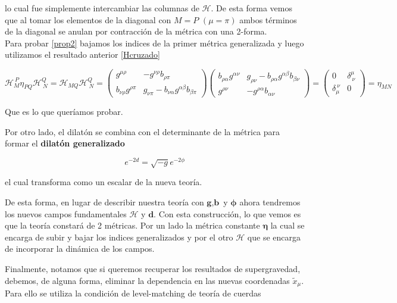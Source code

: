 \documentclass{article}
\numberwithin{equation}{section}
\begin{document}
lo cual fue simplemente intercambiar las columnas de $ \pmb{\mathcal{H}} $. De esta forma vemos que al tomar los elementos de la diagonal con $ M=P $ $ (\mu=\pi) $ ambos términos de la diagonal se anulan por contracción de la métrica con una 2-forma.\\

Para probar \ref{prop2} bajamos los indices de la primer métrica generalizada y luego utilizamos el resultado anterior \ref{Hcruzado}

\begin{equation}\label{key}
\mathcal{H}_M^{\ P}\eta_{PQ}\mathcal{H}^Q_{\ N} = \mathcal{H}_{MQ}\mathcal{H}^Q_{\ N} = 
\begin{pmatrix}
g^{\mu\rho} & -g^{\nu\rho}b_{\rho\pi}\\
b_{\nu\rho}g^{\rho\pi} & g_{\nu\pi} -b_{\nu\alpha}g^{\alpha\beta}b_{\beta\pi}
\end{pmatrix}
\begin{pmatrix}
b_{\rho\alpha}g^{\alpha\nu} & g_{\rho\nu} -b_{\rho\alpha}g^{\alpha\beta}b_{\beta\nu}\\
g^{\rho\nu} & -g^{\rho\alpha}b_{\alpha\nu}
\end{pmatrix} =
\begin{pmatrix}
0 & \delta^{\mu}_{ \ \nu} \\
\delta_{\mu}^{ \ \nu} & 0 
\end{pmatrix} = \eta_{MN}
\end{equation}

Que es lo que queríamos probar.

Por otro lado, el dilatón se combina con el determinante de la métrica para formar el \textbf{dilatón generalizado}

\begin{equation}\label{dilatongeneralizado}
e^{-2d}= \sqrt{-g}e^{-2\phi}
\end{equation}

el cual transforma como un escalar de la nueva teoría.

De esta forma, en lugar de describir nuestra teoría con $ \textbf{g},\textbf{b} $ y $ \pmb{\phi} $ ahora tendremos los nuevos campos fundamentales $ \pmb{\mathcal{H}} $ y $ \pmb{d} $. Con esta construcción, lo que vemos es que la teoría constará de 2 métricas. Por un lado la métrica constante $\pmb{\eta} $ la cual se encarga de subir y bajar los indices generalizados y por el otro $ \pmb{\mathcal{H}} $ que se encarga de incorporar la dinámica de los campos.

Finalmente, notamos que si queremos recuperar los resultados de supergravedad, debemos, de alguna forma, eliminar la dependencia en las nuevas coordenadas $ \tilde{x}_{\mu} $. Para ello se utiliza la condición de level-matching de teoría de cuerdas 
\end{document}
